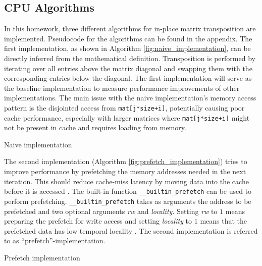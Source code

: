 \documentclass[conference]{IEEEtran}
\begin{document}
    \subsection{CPU Algorithms}
    In this homework, three different algorithms for in-place matrix transposition are implemented. Pseudocode for the algorithms can be found in the appendix. The first implementation, as shown in Algorithm \ref{fig:naive_implementation}, can be directly inferred from the mathematical definition. Transposition is performed by iterating over all entries above the matrix diagonal and swapping them with the corresponding entries below the diagonal. The first implementation will serve as the baseline implementation to measure performance improvements of other implementations. 
    The main issue with the naive implementation's memory access pattern is the disjointed access from \lstinline{mat[j*size+i]}, potentially causing poor cache performance, especially with larger matrices where \lstinline{mat[j*size+i]} might not be present in cache and requires loading from memory.

    \begin{algorithm}
        \BlankLine
        \caption{Naive implementation}
        \label{fig:naive_implementation}   
    \end{algorithm}

    The second implementation (Algorithm \ref{fig:prefetch_implementation}) tries to improve performance by prefetching the memory addresses needed in the next iteration. This should reduce cache-miss latency by moving data into the cache before it is accessed \cite{gccdocs}. The built-in function \lstinline{__builtin_prefetch} can be used to perform prefetching. \lstinline{__builtin_prefetch} takes as arguments the address to be prefetched and two optional arguments \textit{rw} and \textit{locality}. Setting \textit{rw} to $1$ means preparing the prefetch for write access and setting \textit{locality} to $1$ means that the prefetched data has low temporal locality \cite{gccdocs}. The second implementation is referred to as ``prefetch''-implementation.


    \begin{algorithm}
        \BlankLine
        \caption{Prefetch implementation}
        \label{fig:prefetch_implementation}        
    \end{algorithm}
\end{document}
